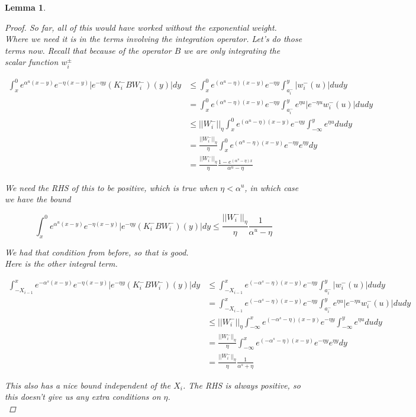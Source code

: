 \documentclass[12pt]{article}
\newtheorem{lemma}{Lemma}
\begin{document}
\begin{lemma}
\begin{proof}
So far, all of this would have worked without the exponential weight. Where we need it is in the terms involving the integration operator. Let's do those terms now. Recall that because of the operator $B$ we are only integrating the scalar function $w_i^\pm$

\begin{align*}
\int_x^0 e^{\alpha^u (x-y)}e^{-\eta(x-y)}|e^{-\eta y} (K_i^- B W_i^-)(y)| dy &\leq \int_x^0 e^{(\alpha^u - \eta)(x-y)}e^{-\eta y} \int_{a_i^-}^y |w_i^-(u)| du dy \\
&= \int_x^0 e^{(\alpha^u - \eta)(x-y)}e^{-\eta y} \int_{a_i^-}^y e^{\eta u} |e^{-\eta u} w_i^-(u)| du dy \\
&\leq ||W_i^-||_\eta \int_x^0 e^{(\alpha^u - \eta)(x-y)}e^{-\eta y} \int_{-\infty}^y e^{\eta u} du dy \\
&= \frac{||W_i^-||_\eta}{\eta} \int_x^0 e^{(\alpha^u - \eta)(x-y)}e^{-\eta y} e^{\eta y} dy \\
&= \frac{||W_i^-||_\eta}{\eta} \frac{1 - e^{(\alpha^u - \eta)x}}{\alpha^u - \eta} 
\end{align*}

We need the RHS of this to be positive, which is true when $\eta < \alpha^u$, in which case we have the bound

\[
\int_x^0 e^{\alpha^u (x-y)}e^{-\eta(x-y)}|e^{-\eta y} (K_i^- B W_i^-)(y)| dy \leq 
\frac{||W_i^-||_\eta}{\eta} \frac{1}{\alpha^u - \eta} 
\]

We had that condition from before, so that is good.\\

Here is the other integral term. 

\begin{align*}
\int_{-X_{i-1}}^x e^{-\alpha^s (x-y)}e^{-\eta(x-y)}|e^{-\eta y} (K_i^- B W_i^-)(y)| dy &\leq \int_{-X_{i-1}}^x e^{(-\alpha^s - \eta)(x-y)}e^{-\eta y} \int_{a_i^-}^y |w_i^-(u)| du dy \\
&= \int_{-X_{i-1}}^x e^{(-\alpha^s - \eta)(x-y)}e^{-\eta y} \int_{a_i^-}^y e^{\eta u} |e^{-\eta u} w_i^-(u)| du dy \\
&\leq ||W_i^-||_\eta \int_{-\infty}^x e^{(-\alpha^s - \eta)(x-y)}e^{-\eta y} \int_{-\infty}^y e^{\eta u} du dy \\
&= \frac{||W_i^-||_\eta}{\eta} \int_{-\infty}^x e^{(-\alpha^s - \eta)(x-y)}e^{-\eta y} e^{\eta y} dy \\
&= \frac{||W_i^-||_\eta}{\eta} \frac{1}{\alpha^s + \eta}
\end{align*}

This also has a nice bound independent of the $X_i$. The RHS is always positive, so this doesn't give us any extra conditions on $\eta$.\\


\end{proof}
\end{lemma}
\end{document}
